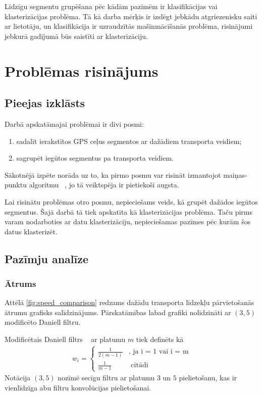 \documentclass{ludis}
\begin{document}
Līdzīgu segmentu grupēšana pēc kādām pazīmēm ir klasifikācijas vai klasterizācijas problēma. Tā kā
darba mērķis ir izslēgt jebkādu atgriezenisku saiti ar lietotāju, un klasifikācija ir uzraudzītās
mašīnmācīšanās problēma, risinājumi jebkurā gadījumā būs saistīti ar klasterizāciju.

\chapter{Problēmas risinājums}
\section{Pieejas izklāsts}
Darbā apskatāmajai problēmai ir divi posmi:
\begin{enumerate}
\item sadalīt ierakstītos GPS ceļus segmentos ar dažādiem transporta veidiem;
\item sagrupēt iegūtos segmentus pa transporta veidiem.
\end{enumerate}

Sākotnējā izpēte norāda uz to, ka pirmo posmu var risināt izmantojot maiņas-punktu algoritmu 
~\cite{zheng_gps_segmentation}, jo tā veiktspēja ir pietiekoši augsta.

Lai risinātu problēmas otro posmu, nepieciešams veids, kā grupēt dažādos iegūtos segmentus.
Šajā darbā tā tiek apskatīta kā klasterizācijas problēma. Taču pirms varam nodarboties ar 
datu klasterizāciju, nepieciešamas pazīmes pēc kurām šos datus klasterizēt.

\section{Pazīmju analīze}
\subsection{Ātrums}
Attēlā \ref{fig:speed_comparison} redzams dažādu transporta līdzekļu pārvietošanās ātrumu grafisks
salīdzinājums. Pārskatāmības labad grafiki nolīdzināti ar $(3, 5)$ modificēto Daniell filtru.

Modificētais Daniell filtrs ~\cite{daniell1946} ar platumu $m$ tiek definēts kā 
\begin{align*}
  w_i = \begin{cases}
    \frac{1}{2 (m - 1)} &\text{, ja i = 1 vai i = m}\\
    \frac{1}{m - 1} &\text{ citādi}
    \end{cases}
\end{align*}
Notācija $(3, 5)$ nozīmē secīgu filtru ar platumu $3$ un $5$ pielietošanu, kas ir vienlīdzīga
abu filtru konvolūcijas pielietošanai.
\end{document}

